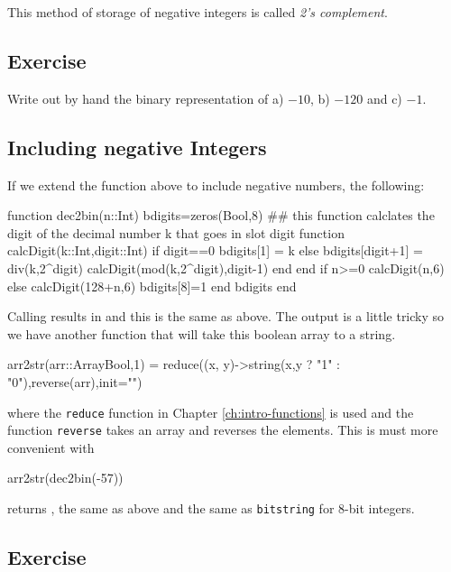 This method of storage of negative integers is called \emph{2's complement}.  


\subsection{Exercise}

Write out by hand the binary representation of a) $-10$, b) $-120$ and c) $-1$. 

\subsection{Including negative Integers} 


If we extend the function above to include negative numbers, the following:

\begin{jlblock}
function dec2bin(n::Int)
  bdigits=zeros(Bool,8)
  ## this function calclates the digit of the decimal number k that goes in slot digit
  function calcDigit(k::Int,digit::Int)
    if digit==0
      bdigits[1] = k
    else 
      bdigits[digit+1] = div(k,2^digit)
      calcDigit(mod(k,2^digit),digit-1)
    end
  end
  if n>=0 
    calcDigit(n,6)
  else 
    calcDigit(128+n,6)
    bdigits[8]=1
  end
  bdigits
end
\end{jlblock}

Calling  results in  \printpythontex[verbatim]
and this is the same as above.  The output is a little tricky so we have another function that will take this boolean array to a string. 

\begin{jlblock}
arr2str(arr::Array{Bool,1}) = reduce((x, y)->string(x,y ? "1" : "0"),reverse(arr),init="")
\end{jlblock}
%
where the \verb!reduce! function in Chapter \ref{ch:intro-functions} is used and the function \verb!reverse! takes an array and reverses the elements.  This is must more convenient with
\begin{jlblock}
arr2str(dec2bin(-57))
\end{jlblock}
returns  \printpythontex[verb], the same as above and the same as \texttt{bitstring} for 8-bit integers.  


\subsection{Exercise}

